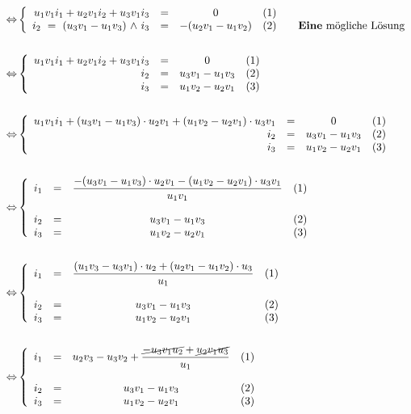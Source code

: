 \documentclass[main.tex]{subfiles}
\begin{document}
\begin{Beweis}
\begin{align*}
            \Leftrightarrow &\left\{\begin{array}{rccl} u_1v_1i_1 + u_2v_1i_2 + u_3v_1i_3 & = & 0 & (1) \\ i_2 \text{ } = \text{ } (u_3v_1 - u_1v_3) \text{ $\land$ } i_3 & = & -(u_2v_1 - u_1v_2) & (2) \qquad \text{\textbf{Eine} mögliche Lösung}\end{array}\right.\\\\
            \Leftrightarrow &\left\{\begin{array}{rccl} u_1v_1i_1 + u_2v_1i_2 + u_3v_1i_3 & = & 0 & (1) \\ i_2 & = & u_3v_1 - u_1v_3 & (2) \\ i_3 & = & u_1v_2 - u_2v_1 & (3) \end{array}\right. \\\\
            \Leftrightarrow &\left\{\begin{array}{rccl} u_1v_1i_1 + (u_3v_1 - u_1v_3) \cdot u_2v_1 + (u_1v_2 - u_2v_1) \cdot u_3v_1 & = & 0 & (1) \\ i_2 & = & u_3v_1 - u_1v_3 & (2) \\ i_3 & = & u_1v_2 - u_2v_1 & (3) \end{array}\right. \\\\
            \Leftrightarrow &\left\{\begin{array}{rccl} i_1 & = & \dfrac{-(u_3v_1 - u_1v_3) \cdot u_2v_1 - (u_1v_2 - u_2v_1) \cdot u_3v_1}{u_1v_1} & (1) \\\\ i_2 & = & u_3v_1 - u_1v_3 & (2) \\ i_3 & = & u_1v_2 - u_2v_1 & (3) \end{array}\right. \\\\
            \Leftrightarrow &\left\{\begin{array}{rccl} i_1 & = & \dfrac{(u_1v_3 - u_3v_1) \cdot u_2 + (u_2v_1 - u_1v_2) \cdot u_3}{u_1} & (1) \\\\ i_2 & = & u_3v_1 - u_1v_3 & (2) \\ i_3 & = & u_1v_2 - u_2v_1 & (3) \end{array}\right. \\\\
            \Leftrightarrow &\left\{\begin{array}{rccl} i_1 & = & u_2v_3 - u_3v_2 + \dfrac{ \cancel{-u_3v_1u_2} + \cancel{u_2v_1u_3}}{u_1} & (1) \\\\ i_2 & = & u_3v_1 - u_1v_3 & (2) \\ i_3 & = & u_1v_2 - u_2v_1 & (3) \end{array}\right. \\\\

\end{align*}
\end{Beweis}
\end{document}
